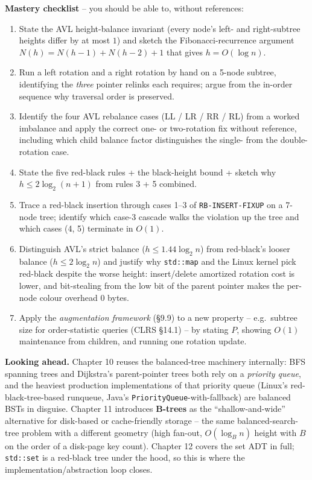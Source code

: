 \documentclass[11pt]{article}
\begin{document}
\begin{ideabox}
\textbf{Mastery checklist} -- you should be able to, without
references:
\begin{enumerate}
    \item State the AVL height-balance invariant
          (every node's left- and right-subtree heights differ by
          at most $1$) and sketch the Fibonacci-recurrence argument
          $N(h) = N(h-1) + N(h-2) + 1$ that gives $h = O(\log n)$.
    \item Run a left rotation and a right rotation by hand on a
          5-node subtree, identifying the \emph{three} pointer
          relinks each requires; argue from the in-order sequence
          why traversal order is preserved.
    \item Identify the four AVL rebalance cases (LL / LR / RR / RL)
          from a worked imbalance and apply the correct one- or
          two-rotation fix without reference, including which child
          balance factor distinguishes the single- from the
          double-rotation case.
    \item State the five red-black rules + the black-height bound +
          sketch why $h \le 2 \log_2(n+1)$ from rules 3 + 5
          combined.
    \item Trace a red-black insertion through cases 1--3 of
          \texttt{RB-INSERT-FIXUP} on a 7-node tree; identify which
          case-3 cascade walks the violation up the tree and which
          cases (4, 5) terminate in $O(1)$.
    \item Distinguish AVL's strict balance ($h \le 1.44 \log_2 n$)
          from red-black's looser balance ($h \le 2 \log_2 n$) and
          justify why \texttt{std::map} and the Linux kernel pick
          red-black despite the worse height: insert/delete
          amortized rotation cost is lower, and bit-stealing from
          the low bit of the parent pointer makes the per-node
          colour overhead $0$ bytes.
    \item Apply the \emph{augmentation framework} (\S9.9) to a new
          property -- e.g.\ subtree size for order-statistic queries
          (CLRS \S14.1) -- by stating $P$, showing $O(1)$
          maintenance from children, and running one rotation
          update.
\end{enumerate}

\textbf{Looking ahead.} Chapter 10 reuses the balanced-tree
machinery internally: BFS spanning trees and Dijkstra's
parent-pointer trees both rely on a \emph{priority queue}, and the
heaviest production implementations of that priority queue (Linux's
red-black-tree-based runqueue, Java's
\texttt{PriorityQueue}-with-fallback) are balanced BSTs in disguise.
Chapter 11 introduces \textbf{B-trees} as the
``shallow-and-wide'' alternative for disk-based or cache-friendly
storage -- the same balanced-search-tree problem with a different
geometry (high fan-out, $O(\log_B n)$ height with $B$ on the order
of a disk-page key count). Chapter 12 covers the set ADT in full;
\texttt{std::set} is a red-black tree under the hood, so this is
where the implementation/abstraction loop closes.
\end{ideabox}
\end{document}
